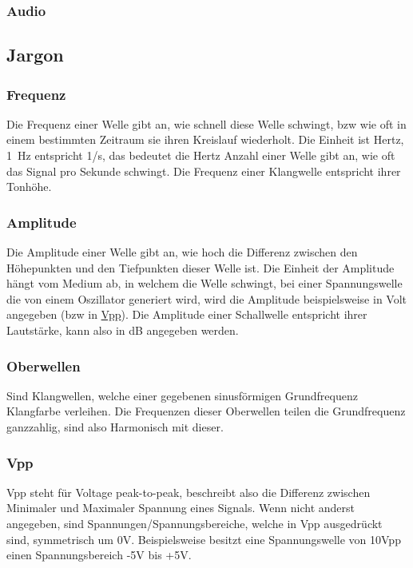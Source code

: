 \subsubsection{Audio}
\label{sec:org85de0d2}

\subsection{Jargon}
\label{sec:orge6a0856}
\subsubsection{Frequenz}
\label{sec:orgc5d5d54}
Die Frequenz einer Welle gibt an, wie schnell diese Welle schwingt, bzw wie oft in einem bestimmten Zeitraum sie ihren Kreislauf wiederholt. Die Einheit ist Hertz, \SI{1}{\hertz} entspricht 1/s, das bedeutet die Hertz Anzahl einer Welle gibt an, wie oft das Signal pro Sekunde schwingt. Die Frequenz einer Klangwelle entspricht ihrer Tonhöhe.

\subsubsection{Amplitude}
\label{sec:org29b58e7}
Die Amplitude einer Welle gibt an, wie hoch die Differenz zwischen den Höhepunkten und den Tiefpunkten dieser Welle ist. Die Einheit der Amplitude hängt vom Medium ab, in welchem die Welle schwingt, bei einer Spannungswelle die von einem Oszillator generiert wird, wird die Amplitude beispielsweise in Volt angegeben (bzw in \hyperref[sec:orgf9e62e2]{Vpp}). Die Amplitude einer Schallwelle entspricht ihrer Lautstärke, kann also in dB angegeben werden.

\subsubsection{Oberwellen}
\label{sec:org91b64a4}
Sind Klangwellen, welche einer gegebenen sinusförmigen Grundfrequenz Klangfarbe verleihen. Die Frequenzen dieser Oberwellen teilen die Grundfrequenz ganzzahlig, sind also Harmonisch mit dieser.

\subsubsection{Vpp}
\label{sec:orgf9e62e2}
Vpp steht für Voltage peak-to-peak, beschreibt also die Differenz zwischen Minimaler und Maximaler Spannung eines Signals. Wenn nicht anderst angegeben, sind Spannungen/Spannungsbereiche, welche in Vpp ausgedrückt sind, symmetrisch um 0V. Beispielsweise besitzt eine Spannungswelle von 10Vpp einen Spannungsbereich -5V bis +5V.

